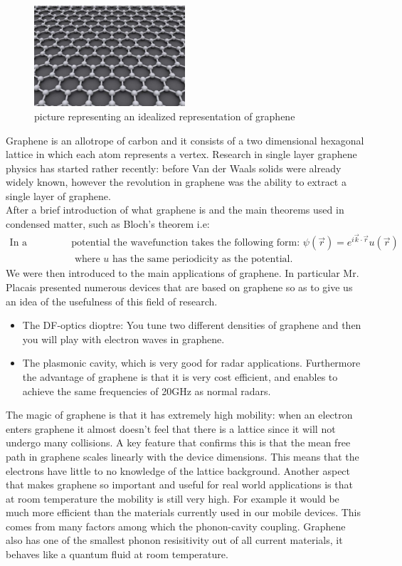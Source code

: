 \documentclass[12pt,a4paper]{article}
\begin{document}
\begin{figure}[h]
\caption{picture representing an idealized representation of graphene}
\centering
\includegraphics[width=0.5\textwidth]{graphene}
\end{figure}
Graphene is an allotrope of carbon and it consists of a two dimensional hexagonal lattice in which each atom represents a vertex.
Research in single layer graphene physics has started rather recently: before Van der Waals solids were already widely known, however the revolution in graphene was the ability to extract a single layer of graphene. \\
After a brief introduction of what graphene is and the main theorems used in condensed matter, such as Bloch's theorem i.e:
\begin{align*}
\text{In a periodic } &\text{potential the wavefunction takes the following form: } \psi(\vec{r}) = e^{i \vec{k} \cdot \vec{r}} u (\vec{r}) \\ 
&\text{ where } u \text{ has the same periodicity as the potential.}
\end{align*}
We were then introduced to the main applications of graphene. In particular Mr. Placais presented numerous devices that are based on graphene so as to give us an idea of the usefulness of this field of research.
\begin{itemize}
\item The DF-optics dioptre: You tune two different densities of graphene and then you will play with electron waves in graphene.
\item The plasmonic cavity, which is very good for radar applications. Furthermore the advantage of graphene is that it is very cost efficient, and enables to achieve the same frequencies of 20GHz as normal radars.
\end{itemize}
The magic of graphene is that it has extremely high mobility: when an electron enters graphene it almost doesn't feel that there is a lattice since it will not undergo many collisions. A key feature that confirms this is that the mean free path in graphene scales linearly with the device dimensions. This means that the electrons have little to no knowledge of the lattice background. Another aspect that makes graphene so important and useful for real world applications is that at room temperature the mobility is still very high. For example it would be much more efficient than the materials currently used in our mobile devices. This comes from many factors among which the phonon-cavity coupling. Graphene also has one of the smallest phonon resisitivity out of all current materials, it behaves like a quantum fluid at room temperature.\\
\end{document}
